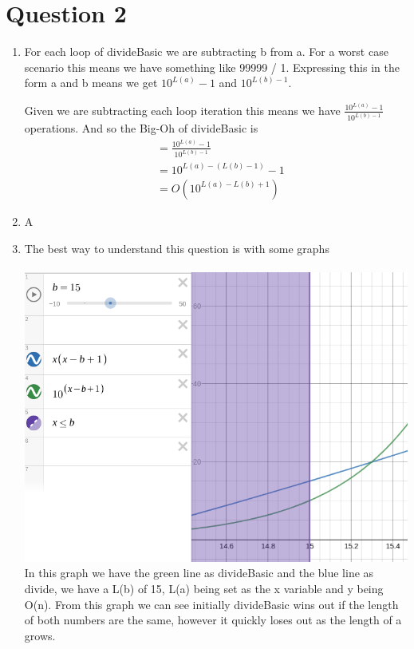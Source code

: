\documentclass[journal,a4paper]{IEEEtran}
\begin{document}
\section*{Question 2}
\begin{enumerate}
	\item For each loop of divideBasic we are subtracting b from a. For a worst case scenario this means we have something like 99999 / 1. Expressing this in the form a and b means we get $10^{L(a)}-1$ and $10^{L(b)-1}$. 

Given we are subtracting each loop iteration this means we have $\frac{10^{L(a)}-1}{10^{L(b)-1}}$ operations. And so the Big-Oh of divideBasic is 
	\begin{align*}
		&= \frac{10^{L(a)}-1}{10^{L(b)-1}} \\
		&= 10^{L(a)-(L(b)-1)} - 1 \\
		&= O(10^{L(a)-L(b)+1})
	\end{align*}
	\item A
	\item The best way to understand this question is with some graphs
	\\\\
	\includegraphics[scale=2]{divide-complexity-1} \\
	In this graph we have the green line as divideBasic and the blue line as divide, we have a L(b) of 15, L(a) being set as the x variable and y being O(n). From this graph we can see initially divideBasic wins out if the length of both numbers are the same, however it quickly loses out as the length of a grows.
	\\\\

\end{enumerate}
\end{document}
